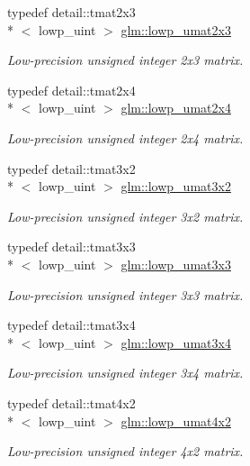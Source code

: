 \begin{DoxyCompactItemize}
typedef detail\-::tmat2x3\\*
$<$ lowp\-\_\-uint $>$ \hyperlink{group__gtc__matrix__integer_gacce75aac1f0f0ae3cc18f4cde5db8def}{glm\-::lowp\-\_\-umat2x3}
\begin{DoxyCompactList}\small\item\em Low-\/precision unsigned integer 2x3 matrix. \end{DoxyCompactList}\item 
typedef detail\-::tmat2x4\\*
$<$ lowp\-\_\-uint $>$ \hyperlink{group__gtc__matrix__integer_gaf468ff72b7f833789887c61b8db33869}{glm\-::lowp\-\_\-umat2x4}
\begin{DoxyCompactList}\small\item\em Low-\/precision unsigned integer 2x4 matrix. \end{DoxyCompactList}\item 
typedef detail\-::tmat3x2\\*
$<$ lowp\-\_\-uint $>$ \hyperlink{group__gtc__matrix__integer_gab06e14a13476419d7e8c2421fc7f60a1}{glm\-::lowp\-\_\-umat3x2}
\begin{DoxyCompactList}\small\item\em Low-\/precision unsigned integer 3x2 matrix. \end{DoxyCompactList}\item 
typedef detail\-::tmat3x3\\*
$<$ lowp\-\_\-uint $>$ \hyperlink{group__gtc__matrix__integer_ga228d53c61d9ebac283e8f76754c6cff1}{glm\-::lowp\-\_\-umat3x3}
\begin{DoxyCompactList}\small\item\em Low-\/precision unsigned integer 3x3 matrix. \end{DoxyCompactList}\item 
typedef detail\-::tmat3x4\\*
$<$ lowp\-\_\-uint $>$ \hyperlink{group__gtc__matrix__integer_gace8e281261bb90e62c67444ec0c9e7e7}{glm\-::lowp\-\_\-umat3x4}
\begin{DoxyCompactList}\small\item\em Low-\/precision unsigned integer 3x4 matrix. \end{DoxyCompactList}\item 
typedef detail\-::tmat4x2\\*
$<$ lowp\-\_\-uint $>$ \hyperlink{group__gtc__matrix__integer_gacc7fd3996cf8cb661099c95a0363d051}{glm\-::lowp\-\_\-umat4x2}
\begin{DoxyCompactList}\small\item\em Low-\/precision unsigned integer 4x2 matrix. \end{DoxyCompactList}\item 

\end{DoxyCompactItemize}
